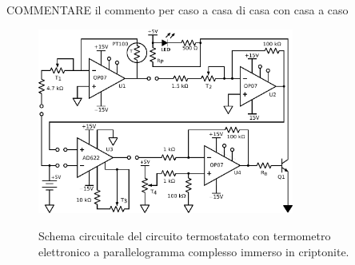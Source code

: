 COMMENTARE il commento per caso a casa di casa con casa a caso

\begin{figure}[ht]
 \centering
   {\includegraphics[width=0.75\textwidth]{../E06/latex/c2.pdf}}
 \caption{Schema circuitale del circuito termostatato con termometro elettronico a parallelogramma complesso immerso in criptonite.}
 \label{gr6:a_caso}
\end{figure}
